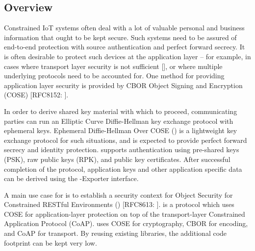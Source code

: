 


\subsection{Overview}
Constrained IoT systems often deal with a lot of valuable personal and business information that ought to be kept secure. Such systems need to be assured of end-to-end protection with source authentication and perfect forward secrecy. It is often desirable to protect such devices at the application layer -- for example, in cases where transport layer security is not sufficient [\mcneed], or where multiple underlying protocols need to be accounted for. One method for providing application layer security is provided by CBOR Object Signing and Encryption (COSE) [RFC8152: \mcfix].  

In order to derive shared key material with which to proceed, communicating parties can run an Elliptic Curve Diffie-Hellman key exchange protocol with ephemeral keys. Ephemeral Diffie-Hellman Over COSE (\mEdhoc) is a lightweight key exchange protocol for such situations, and is expected to provide perfect forward secrecy and identity protection. \mEdhoc supports authentication using pre-shared keys (PSK), raw public keys (RPK), and public key certificates. After successful completion of the \mEdhoc protocol, application keys and other application specific data can be derived using the \mEdhoc-Exporter interface. 

A main use case for \mEdhoc is to establish a security context for Object Security for Constrained RESTful Environments (\mOscore) [RFC8613: \mcfix]. \mOscore is a protocol which uses COSE for application-layer protection on top of the transport-layer Constrained Application Protocol (CoAP). \mEdhoc uses COSE for cryptography, CBOR for encoding, and CoAP for transport. By reusing existing libraries, the additional code footprint can be kept very low.

